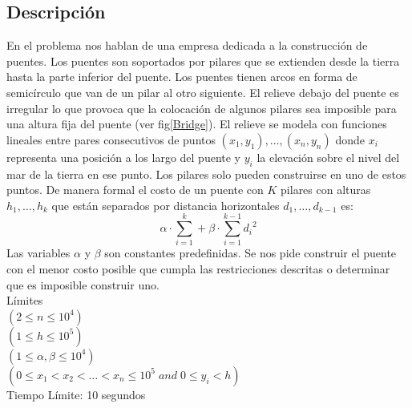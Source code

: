\documentclass{report}
\begin{document}
\subsection{Descripci\'on}
En el problema nos hablan de una empresa dedicada a la construcci\'on de puentes. Los puentes son soportados por pilares que se extienden desde la tierra hasta la parte inferior del puente. Los puentes tienen arcos en forma de semic\'irculo que van de un pilar al otro siguiente. El relieve debajo del puente es irregular lo que provoca que la colocaci\'on de algunos pilares sea imposible para una altura fija del puente (ver fig\ref{Bridge}). El relieve se modela con funciones lineales entre pares consecutivos de puntos $(x_1,y_1),\ldots,(x_n,y_n)$ donde $x_i$ representa una posici\'on a los largo del puente y $y_i$ la elevaci\'on sobre el nivel del mar de la tierra en ese punto. Los pilares solo pueden construirse en uno de estos puntos. De manera formal el costo de un puente con $K$ pilares con alturas $h_1,\ldots, h_k$ que est\'an separados por distancia horizontales $d_1,\ldots,d_{k-1}$ es:\\
\begin{equation}
\displaystyle{\alpha \cdot \sum_{i=1}^{k} + \beta \cdot \sum_{i=1}^{k-1} {d_i}^2}
\end{equation}
Las variables $\alpha$ y $\beta$ son constantes predefinidas. Se nos pide construir el puente con el menor costo posible que cumpla las restricciones descritas o determinar que es imposible construir uno.\\
L\'imites\\
$(2 \leq n \leq 10^4)$\\
$(1 \leq h \leq 10^5)$\\
$(1 \leq \alpha, \beta \leq 10^4)$\\
$(0 ≤ x_1 < x_2 < \ldots < x_n \leq 10^5 \;and\; 0 \leq y_i < h)$\\
Tiempo L\'imite: 10 segundos\\
\end{document}
